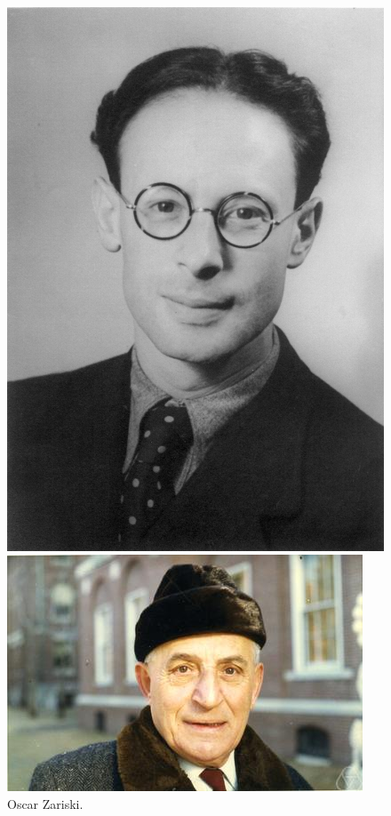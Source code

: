 \documentclass [11 pt, oneside] {article}
\begin{document}
\begin{figure}
	\begin{center}
		\includegraphics [scale = 0.4] {images/weil}
		\caption {Andr\'e Weil.}
	\end{center}
	\begin{center}
		\includegraphics [scale = 0.75] {images/zariski}
		\caption {Oscar Zariski.}
	\end{center}
\end{figure}
\end{document}
